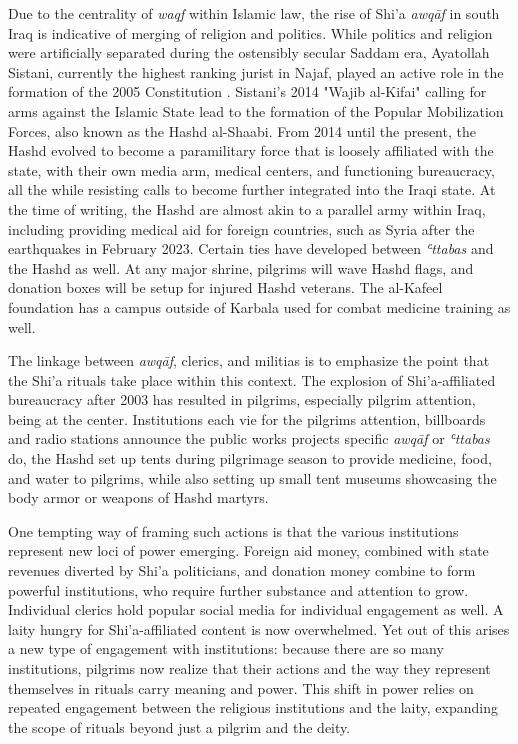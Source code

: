 Due to the centrality of \emph{waqf} within Islamic law, the rise of Shi'a \emph{awqāf} in south Iraq is indicative of merging of religion and politics. While politics and religion were artificially separated during the ostensibly secular Saddam era, Ayatollah Sistani, currently the highest ranking jurist in Najaf, played an active role in the formation of the 2005 Constitution \cite[146]{nakash_reaching_2006}. Sistani's 2014 "Wajib al-Kifai" calling for arms against the Islamic State lead to the formation of the Popular Mobilization Forces, also known as the Hashd al-Shaabi. From 2014 until the present, the Hashd evolved to become a paramilitary force that is loosely affiliated with the state, with their own media arm, medical centers, and functioning bureaucracy, all the while resisting calls to become further integrated into the Iraqi state. At the time of writing, the Hashd are almost akin to a parallel army within Iraq, including providing medical aid for foreign countries, such as Syria after the earthquakes in February 2023. Certain ties have developed between \emph{ʿttabas} and the Hashd as well. At any major shrine, pilgrims will wave Hashd flags, and donation boxes will be setup for injured Hashd veterans. The al-Kafeel foundation has a campus outside of Karbala used for combat medicine training as well. 

The linkage between \emph{awqāf}, clerics, and militias is to emphasize the point that the Shi'a rituals take place within this context. The explosion of Shi'a-affiliated bureaucracy after 2003 has resulted in pilgrims, especially pilgrim attention, being at the center. Institutions each vie for the pilgrims attention, billboards and radio stations announce the public works projects specific \emph{awqāf} or \emph{ʿttabas} do, the Hashd set up tents during pilgrimage season to provide medicine, food, and water to pilgrims, while also setting up small tent museums showcasing the body armor or weapons of Hashd martyrs. 

One tempting way of framing such actions is that the various institutions represent new loci of power emerging. Foreign aid money, combined with state revenues diverted by Shi'a politicians, and donation money combine to form powerful institutions, who require further substance and attention to grow. Individual clerics hold popular social media \cite{ann_wainscott_engaging_2019} for individual engagement as well. A laity hungry for Shi'a-affiliated content is now overwhelmed. Yet out of this arises a new type of engagement with institutions: because there are so many institutions, pilgrims now realize that their actions and the way they represent themselves in rituals carry meaning and power. This shift in power relies on repeated engagement between the religious institutions and the laity, expanding the scope of rituals beyond just a pilgrim and the deity. 

